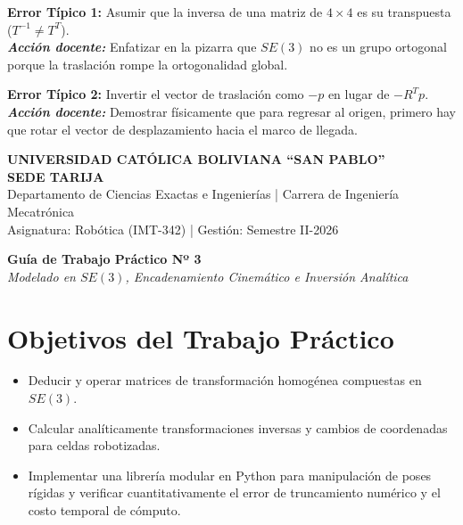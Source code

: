 \documentclass[11pt, a4paper]{article}
\begin{document}
\vspace{0.4cm}
\begin{tcolorbox}[colback=red!5!white, colframe=red!75!black, title=\textbf{3. Puntos Críticos y Errores Conceptuales Frecuentes}]
\textbf{Error Típico 1:} Asumir que la inversa de una matriz de $4 \times 4$ es su transpuesta ($T^{-1} \neq T^T$). \\
\textbf{\textit{Acción docente:}} Enfatizar en la pizarra que $SE(3)$ no es un grupo ortogonal porque la traslación rompe la ortogonalidad global.

\vspace{0.2cm}
\textbf{Error Típico 2:} Invertir el vector de traslación como $-p$ en lugar de $-R^T p$. \\
\textbf{\textit{Acción docente:}} Demostrar físicamente que para regresar al origen, primero hay que rotar el vector de desplazamiento hacia el marco de llegada.
\end{tcolorbox}

\newpage
\begin{center}
    \Large\textbf{\textcolor{ucbblue}{UNIVERSIDAD CATÓLICA BOLIVIANA \textquotedblleft SAN PABLO\textquotedblright}}\\
    \large\textbf{SEDE TARIJA}\\
    \vspace{0.2cm}
    \normalsize Departamento de Ciencias Exactas e Ingenierías | Carrera de Ingeniería Mecatrónica\\
    Asignatura: Robótica (IMT-342) | Gestión: Semestre II-2026
\end{center}

\vspace{0.4cm}
\begin{center}
    \Large\textbf{Guía de Trabajo Práctico Nº 3}\\
    \large\textit{Modelado en $SE(3)$, Encadenamiento Cinemático e Inversión Analítica}
\end{center}
\vspace{0.4cm}

\section{Objetivos del Trabajo Práctico}
\begin{itemize}[label=$\circ$]
    \item Deducir y operar matrices de transformación homogénea compuestas en $SE(3)$.
    \item Calcular analíticamente transformaciones inversas y cambios de coordenadas para celdas robotizadas.
    \item Implementar una librería modular en Python para manipulación de poses rígidas y verificar cuantitativamente el error de truncamiento numérico y el costo temporal de cómputo.
\end{itemize}
\end{document}
